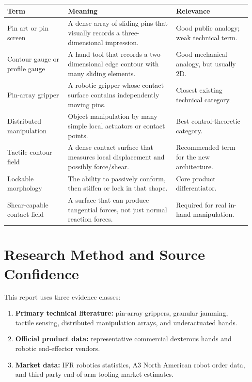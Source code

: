 \documentclass[11pt]{article}
\begin{document}
\begin{longtable}{L{0.25\textwidth} L{0.32\textwidth} L{0.33\textwidth}}
\toprule
\textbf{Term} & \textbf{Meaning} & \textbf{Relevance} \\
\midrule
\endhead
Pin art or pin screen & A dense array of sliding pins that visually records a three-dimensional impression. & Good public analogy; weak technical term. \\
Contour gauge or profile gauge & A hand tool that records a two-dimensional edge contour with many sliding elements. & Good mechanical analogy, but usually 2D. \\
Pin-array gripper & A robotic gripper whose contact surface contains independently moving pins. & Closest existing technical category. \\
Distributed manipulation & Object manipulation by many simple local actuators or contact points. & Best control-theoretic category. \\
Tactile contour field & A dense contact surface that measures local displacement and possibly force/shear. & Recommended term for the new architecture. \\
Lockable morphology & The ability to passively conform, then stiffen or lock in that shape. & Core product differentiator. \\
Shear-capable contact field & A surface that can produce tangential forces, not just normal reaction forces. & Required for real in-hand manipulation. \\
\bottomrule
\end{longtable}

\section{Research Method and Source Confidence}

This report uses three evidence classes:

\begin{enumerate}[leftmargin=*]
  \item \textbf{Primary technical literature:} pin-array grippers, granular jamming, tactile sensing, distributed manipulation arrays, and underactuated hands.
  \item \textbf{Official product data:} representative commercial dexterous hands and robotic end-effector vendors.
  \item \textbf{Market data:} IFR robotics statistics, A3 North American robot order data, and third-party end-of-arm-tooling market estimates.
\end{enumerate}
\end{document}
